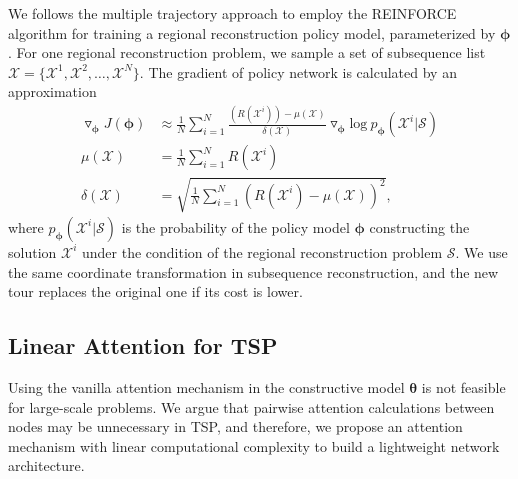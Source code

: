 We follows the multiple trajectory approach \cite{kwon2020pomo} to employ the REINFORCE algorithm \cite{williams1992simple} for training a regional reconstruction policy model, parameterized by $\boldsymbol{\phi}$. 
For one regional reconstruction problem, we sample a set of subsequence list $\boldsymbol{\mathcal{X}}=\{\mathcal{X}^{1}, \mathcal{X}^{2}, \dots, \mathcal{X}^{N} \}$. 
The gradient of policy network is calculated by an approximation 
\begin{equation}
\begin{aligned}
\triangledown_{\boldsymbol{\phi}}J(\boldsymbol{\phi}) &\approx \frac{1}{N}\sum\limits_{i=1}^{N} \frac{(R(\mathcal{X}^{i})) - \mu(\boldsymbol{\mathcal{X}})}{\delta(\boldsymbol{\mathcal{X}})} \triangledown_{\boldsymbol{\phi}} \text{log} ~ p_{\boldsymbol{\phi}}(\mathcal{X}^{i}| \mathcal{S}) 
\\
\mu(\boldsymbol{\mathcal{X}}) &= \frac{1}{N}\sum\limits_{i=1}^{N} R(\mathcal{X}^{i}) \\
\delta(\boldsymbol{\mathcal{X}}) &= \sqrt{\frac{1}{N}\sum\limits_{i=1}^{N} (R(\mathcal{X}^{i})-\mu(\boldsymbol{\mathcal{X}}))^2}
, 
\label{eq:Regional Reconstruction Gradient}
\end{aligned}
\end{equation}
where $p_{\boldsymbol{\phi}}(\mathcal{X}^{i}| \mathcal{S})$ is the probability of the policy model $\boldsymbol{\phi}$ constructing the solution $\mathcal{X}^{i}$ under the condition of the regional reconstruction problem $\mathcal{S}$. We use the same coordinate transformation in subsequence reconstruction, and the new tour replaces the original one if its cost is lower.

\subsection{Linear Attention for TSP}
Using the vanilla attention mechanism \cite{vaswani2017attention} in the constructive model $\boldsymbol{\theta}$ is not feasible for large-scale problems. We argue that pairwise attention calculations between nodes may be unnecessary in TSP, and therefore, we propose an attention mechanism with linear computational complexity to build a lightweight network architecture. 

